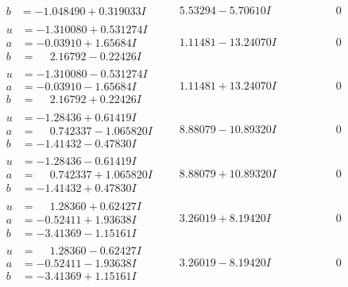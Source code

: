 \documentclass[1p]{elsarticle_modified}
\theoremstyle{definition}
\begin{document}
$$\begin{array}{c|c|c}
\begin{aligned}
b &= -1.048490 + 0.319033 I\end{aligned}
 & \phantom{-}5.53294 - 5.70610 I & \phantom{-0.000000 } 0 \\ \hline\begin{aligned}
u &= -1.310080 + 0.531274 I \\
a &= -0.03910 + 1.65684 I \\
b &= \phantom{-}2.16792 - 0.22426 I\end{aligned}
 & \phantom{-}1.11481 - 13.24070 I & \phantom{-0.000000 } 0 \\ \hline\begin{aligned}
u &= -1.310080 - 0.531274 I \\
a &= -0.03910 - 1.65684 I \\
b &= \phantom{-}2.16792 + 0.22426 I\end{aligned}
 & \phantom{-}1.11481 + 13.24070 I & \phantom{-0.000000 } 0 \\ \hline\begin{aligned}
u &= -1.28436 + 0.61419 I \\
a &= \phantom{-}0.742337 - 1.065820 I \\
b &= -1.41432 - 0.47830 I\end{aligned}
 & \phantom{-}8.88079 - 10.89320 I & \phantom{-0.000000 } 0 \\ \hline\begin{aligned}
u &= -1.28436 - 0.61419 I \\
a &= \phantom{-}0.742337 + 1.065820 I \\
b &= -1.41432 + 0.47830 I\end{aligned}
 & \phantom{-}8.88079 + 10.89320 I & \phantom{-0.000000 } 0 \\ \hline\begin{aligned}
u &= \phantom{-}1.28360 + 0.62427 I \\
a &= -0.52411 + 1.93638 I \\
b &= -3.41369 - 1.15161 I\end{aligned}
 & \phantom{-}3.26019 + 8.19420 I & \phantom{-0.000000 } 0 \\ \hline\begin{aligned}
u &= \phantom{-}1.28360 - 0.62427 I \\
a &= -0.52411 - 1.93638 I \\
b &= -3.41369 + 1.15161 I\end{aligned}
 & \phantom{-}3.26019 - 8.19420 I & \phantom{-0.000000 } 0 \\ \hline\begin{aligned}

\end{aligned}
\end{array}$$
\end{document}

